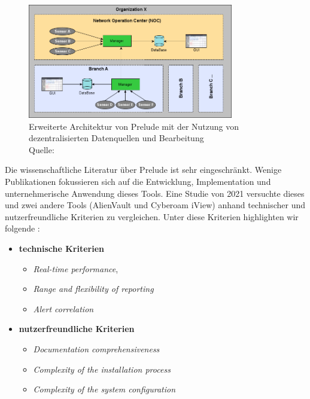 \begin{figure}[H]
   \centering
   \includegraphics[width=0.8\textwidth]{assets/2_p5.png}
   \caption{Erweiterte Architektur von Prelude mit der Nutzung von dezentralisierten Datenquellen und Bearbeitung \\Quelle: \citep{Prelude_MU} }
   \centering
\end{figure}

Die wissenschaftliche Literatur über Prelude ist sehr eingeschränkt. Wenige Publikationen fokussieren sich auf die Entwicklung, Implementation und unternehmerische Anwendung dieses Tools. Eine Studie von 2021 versuchte dieses und zwei andere Tools (AlienVault und Cyberoam iView) anhand technischer und nutzerfreundliche Kriterien zu vergleichen. Unter diese Kriterien highlighten wir folgende \citep{Grammatikis_Prelude}:

\begin{itemize}[noitemsep]
   \item \textbf{technische Kriterien}
   \begin{itemize}[noitemsep]
      \item \textit{Real-time performance}, 
      \item \textit{Range and flexibility of reporting}
      \item \textit{Alert correlation}
   \end{itemize}

   \item \textbf{nutzerfreundliche Kriterien}
   \begin{itemize}[noitemsep]
      \item \textit{Documentation comprehensiveness}
      \item \textit{Complexity of the installation process}
      \item \textit{Complexity of the system configuration}
   \end{itemize}
\end{itemize}

